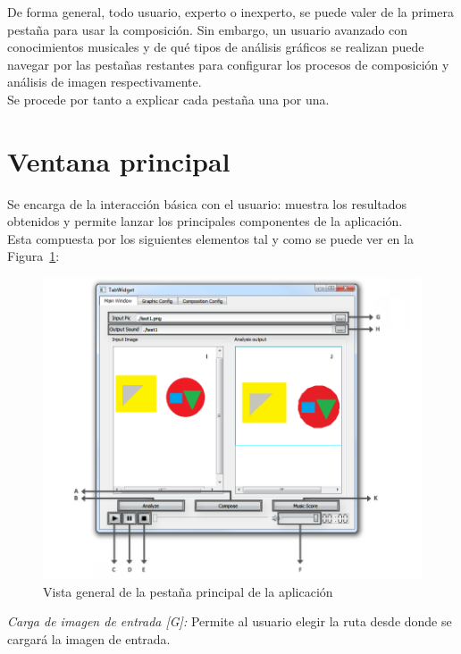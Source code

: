 		De forma general, todo usuario, experto o inexperto, se puede valer de la primera pestaña para usar la composición. Sin embargo, un usuario avanzado con conocimientos musicales y de qué tipos de análisis gráficos se realizan puede navegar por las pestañas restantes para configurar los procesos de composición y análisis de imagen respectivamente.\\
		
		Se procede por tanto a explicar cada pestaña una por una.

	\section{Ventana principal}
		
		Se encarga de la interacción básica con el usuario: muestra los resultados obtenidos y permite lanzar los principales componentes de la aplicación. 
		\\Esta compuesta por los siguientes elementos tal y como se puede ver en la Figura~\ref{fig:interfaz}:\\
		
		
		\begin{figure}[htbp]
		\centering
		\hspace*{-0.5in}
		\includegraphics[scale=0.50]{graphics/interfaz.png}
		\caption{Vista general de la pestaña principal de la aplicación}
		\label{fig:interfaz}
		\end{figure}
		
		\noindent\textit{Carga de imagen de entrada [G]:} Permite al usuario elegir la ruta desde donde se cargará la imagen de entrada.\\
		

